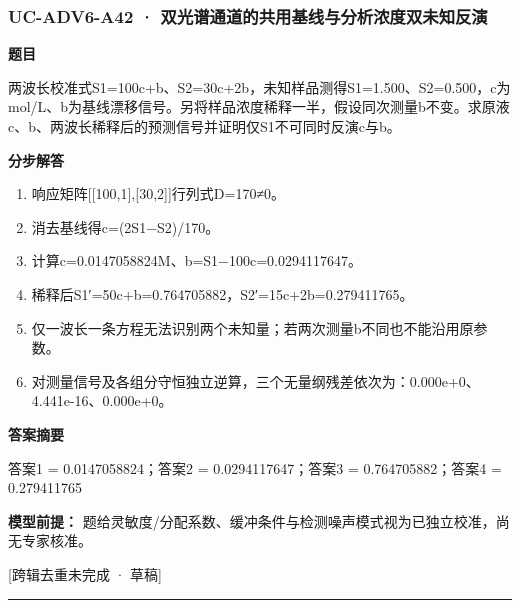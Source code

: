 \documentclass[UTF8,11pt,a4paper]{ctexart}
\begin{document}
\subsubsection*{UC-ADV6-A42 · 双光谱通道的共用基线与分析浓度双未知反演}
\noindent\textbf{题目}\par
两波长校准式S1=100c+b、S2=30c+2b，未知样品测得S1=1.500、S2=0.500，c为mol/L、b为基线漂移信号。另将样品浓度稀释一半，假设同次测量b不变。求原液c、b、两波长稀释后的预测信号并证明仅S1不可同时反演c与b。\par
\medskip\noindent\textbf{分步解答}
\begin{enumerate}
\item 响应矩阵[[100,1],[30,2]]行列式D=170≠0。
\item 消去基线得c=(2S1−S2)/170。
\item 计算c=0.0147058824M、b=S1−100c=0.0294117647。
\item 稀释后S1′=50c+b=0.764705882，S2′=15c+2b=0.279411765。
\item 仅一波长一条方程无法识别两个未知量；若两次测量b不同也不能沿用原参数。
\item 对测量信号及各组分守恒独立逆算，三个无量纲残差依次为：0.000e+0、4.441e-16、0.000e+0。
\end{enumerate}
\noindent\textbf{答案摘要}\par
答案1 = 0.0147058824；答案2 = 0.0294117647；答案3 = 0.764705882；答案4 = 0.279411765\par
\noindent\textbf{模型前提：}
题给灵敏度/分配系数、缓冲条件与检测噪声模式视为已独立校准，尚无专家核准。\par
\noindent\textcolor{red!65!black}{[跨辑去重未完成 · 草稿]} \par
\medskip\hrule\medskip
{}
\end{document}
